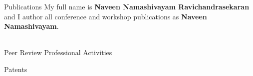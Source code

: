 \documentclass{resume}
\begin{document}
\begin{rSection}{Publications}
My full name is \textbf{Naveen Namashivayam Ravichandrasekaran} and I author all
conference and workshop publications as \textbf{Naveen Namashivayam}.\\ \\

\end{rSection}

\begin{rSection}{Peer Review Professional Activities}

\end{rSection}

\begin{rSection}{Patents}

\end{rSection}


% 
\end{document}
